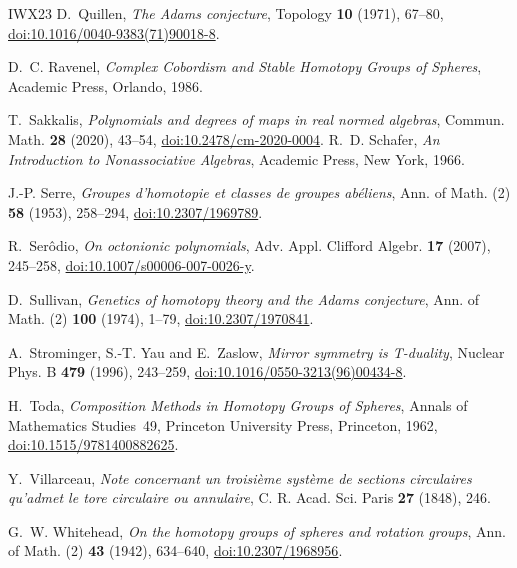 \begin{thebibliography}{IWX23}
 D.~Quillen, \emph{The Adams conjecture}, Topology \textbf{10} (1971), 67--80, \href{https://doi.org/10.1016/0040-9383(71)90018-8}{doi:10.1016/0040-9383(71)90018-8}.

 D.~C. Ravenel, \emph{Complex Cobordism and Stable Homotopy Groups of Spheres}, Academic Press, Orlando, 1986.

 T.~Sakkalis, \emph{Polynomials and degrees of maps in real normed algebras}, Commun. Math. \textbf{28} (2020), 43--54, \href{https://doi.org/10.2478/cm-2020-0004}{doi:10.2478/cm-2020-0004}.
 R.~D. Schafer, \emph{An Introduction to Nonassociative Algebras}, Academic Press, New York, 1966.

 J.-P. Serre, \emph{Groupes d'homotopie et classes de groupes ab\'eliens}, Ann. of Math. (2) \textbf{58} (1953), 258--294, \href{https://doi.org/10.2307/1969789}{doi:10.2307/1969789}.

 R.~Ser\^odio, \emph{On octonionic polynomials}, Adv. Appl. Clifford Algebr. \textbf{17} (2007), 245--258, \href{https://doi.org/10.1007/s00006-007-0026-y}{doi:10.1007/s00006-007-0026-y}.

 D.~Sullivan, \emph{Genetics of homotopy theory and the Adams conjecture}, Ann. of Math. (2) \textbf{100} (1974), 1--79, \href{https://doi.org/10.2307/1970841}{doi:10.2307/1970841}.

 A.~Strominger, S.-T. Yau and E.~Zaslow, \emph{Mirror symmetry is T-duality}, Nuclear Phys. B \textbf{479} (1996), 243--259, \href{https://doi.org/10.1016/0550-3213(96)00434-8}{doi:10.1016/0550-3213(96)00434-8}.

 H.~Toda, \emph{Composition Methods in Homotopy Groups of Spheres}, Annals of Mathematics Studies~49, Princeton University Press, Princeton, 1962, \href{https://doi.org/10.1515/9781400882625}{doi:10.1515/9781400882625}.

 Y.~Villarceau, \emph{Note concernant un troisi\`eme syst\`eme de sections circulaires qu'admet le tore circulaire ou annulaire}, C. R. Acad. Sci. Paris \textbf{27} (1848), 246.

 G.~W. Whitehead, \emph{On the homotopy groups of spheres and rotation groups}, Ann. of Math. (2) \textbf{43} (1942), 634--640, \href{https://doi.org/10.2307/1968956}{doi:10.2307/1968956}.

\end{thebibliography}
\endgroup
